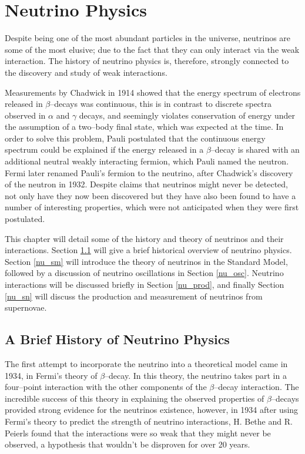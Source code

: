 \chapter{\label{ch:neutrinophysics}Neutrino Physics} 

\minitoc

\noindent
Despite being one of the most abundant particles in the universe, neutrinos are 
some of the most elusive; due to the fact that they can only interact via
the weak interaction. The history of neutrino physics is, therefore, strongly
connected to the discovery and study of weak interactions. 

Measurements by Chadwick in 1914 showed that the energy spectrum of electrons 
released in $\beta$--decays was 
continuous\cite{chadwick1914intensitatsverteilung}, this is in contrast to 
discrete spectra observed in $\alpha$ and $\gamma$ decays, and seemingly 
violates conservation of energy under the assumption of a two--body final 
state, which was expected at the time. In order to solve this problem, Pauli 
postulated that the continuous energy spectrum could be explained if the 
energy released in a $\beta$--decay is shared with an additional neutral 
weakly interacting fermion\cite{Pauli:83282}, which Pauli named the neutron. 
Fermi later renamed Pauli's fermion to the neutrino, after Chadwick's 
discovery of the neutron in 1932. Despite claims that neutrinos might never be 
detected, not only have they now been discovered but they have also been found 
to have a number of interesting properties, which were not anticipated when 
they were first postulated. 

This chapter will detail some of the history and theory of neutrinos and their 
interactions. Section \ref{nu_hist} will give a brief historical overview of 
neutrino physics. Section \ref{nu_sm} will introduce the theory of neutrinos 
in the Standard Model, followed by a discussion of neutrino oscillations in 
Section \ref{nu_osc}. Neutrino interactions will be discussed briefly in 
Section \ref{nu_prod}, and finally Section \ref{nu_sn} will discuss the 
production and measurement of neutrinos from supernovae.

\section{A Brief History of Neutrino Physics} \label{nu_hist}

The first attempt to incorporate the neutrino into a theoretical model came in
1934, in Fermi's theory of \(\beta\)--decay. In this theory, the neutrino takes 
part in a four--point interaction with the other components of the 
\(\beta\)--decay interaction\cite{Fermi1934}. The incredible success of 
this theory in explaining the observed properties of \(\beta\)--decays 
provided strong evidence for the neutrinos existence, however, in 1934 after 
using Fermi's theory to predict the strength of neutrino interactions, H. 
Bethe and R. Peierls found that the interactions were so weak that they might 
never be observed, a hypothesis that wouldn't be disproven for over 20 
years\cite{Bethe1934}.

